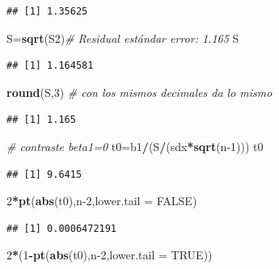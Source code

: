 \documentclass[
]{article}
\newenvironment{Shaded}{\begin{snugshade}}{\end{snugshade}}
\newcommand{\CommentTok}[1]{\textcolor[rgb]{0.56,0.35,0.01}{\textit{#1}}}
\newcommand{\DataTypeTok}[1]{\textcolor[rgb]{0.13,0.29,0.53}{#1}}
\newcommand{\DecValTok}[1]{\textcolor[rgb]{0.00,0.00,0.81}{#1}}
\newcommand{\KeywordTok}[1]{\textcolor[rgb]{0.13,0.29,0.53}{\textbf{#1}}}
\newcommand{\NormalTok}[1]{#1}
\newcommand{\OperatorTok}[1]{\textcolor[rgb]{0.81,0.36,0.00}{\textbf{#1}}}
\newcommand{\OtherTok}[1]{\textcolor[rgb]{0.56,0.35,0.01}{#1}}
\begin{document}
\begin{verbatim}
## [1] 1.35625
\end{verbatim}

\begin{Shaded}
\begin{Highlighting}[]
\NormalTok{S=}\KeywordTok{sqrt}\NormalTok{(S2)}\CommentTok{\# Residual estándar error: 1.165}
\NormalTok{S}
\end{Highlighting}
\end{Shaded}

\begin{verbatim}
## [1] 1.164581
\end{verbatim}

\begin{Shaded}
\begin{Highlighting}[]
\KeywordTok{round}\NormalTok{(S,}\DecValTok{3}\NormalTok{) }\CommentTok{\# con los mismos decimales da lo mismo}
\end{Highlighting}
\end{Shaded}

\begin{verbatim}
## [1] 1.165
\end{verbatim}

\begin{Shaded}
\begin{Highlighting}[]
 \CommentTok{\# contraste beta1=0}
\NormalTok{t0=b1}\OperatorTok{/}\NormalTok{(S}\OperatorTok{/}\NormalTok{(sdx}\OperatorTok{*}\KeywordTok{sqrt}\NormalTok{(n}\DecValTok{{-}1}\NormalTok{)))}
\NormalTok{t0}
\end{Highlighting}
\end{Shaded}

\begin{verbatim}
## [1] 9.6415
\end{verbatim}

\begin{Shaded}
\begin{Highlighting}[]
\DecValTok{2}\OperatorTok{*}\KeywordTok{pt}\NormalTok{(}\KeywordTok{abs}\NormalTok{(t0),n}\DecValTok{{-}2}\NormalTok{,}\DataTypeTok{lower.tail =} \OtherTok{FALSE}\NormalTok{)}
\end{Highlighting}
\end{Shaded}

\begin{verbatim}
## [1] 0.0006472191
\end{verbatim}

\begin{Shaded}
\begin{Highlighting}[]
\DecValTok{2}\OperatorTok{*}\NormalTok{(}\DecValTok{1}\OperatorTok{{-}}\KeywordTok{pt}\NormalTok{(}\KeywordTok{abs}\NormalTok{(t0),n}\DecValTok{{-}2}\NormalTok{,}\DataTypeTok{lower.tail =} \OtherTok{TRUE}\NormalTok{))}
\end{Highlighting}
\end{Shaded}
\end{document}
